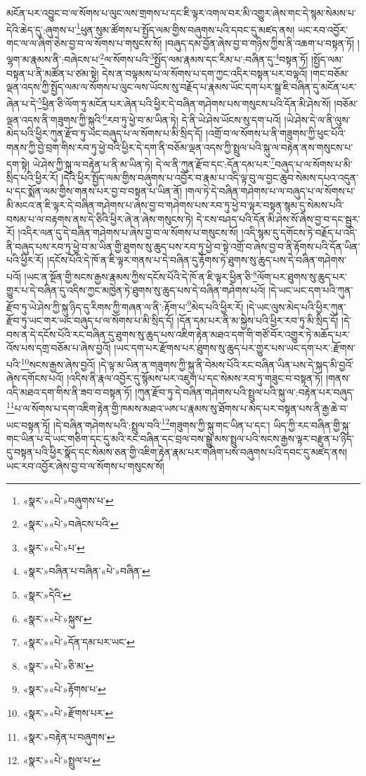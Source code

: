 མངོན་པར་འབྱུང་བ་ལ་སོགས་པ་ལུང་ལས་གྲགས་པ་དང་ཇི་ལྟར་འགལ་བར་མི་འགྱུར་ཞེས་གང་དེ་སྙམ་སེམས་པ་དེའི་ཆེད་དུ་:ཞུགས་པ་\footnote{«སྣར་»«པེ་»བཞུགས་པ་}ཕུན་སུམ་ཚོགས་པ་སྤྱོད་ལམ་གྱིས་བཞུགས་པའི་དབང་དུ་མཛད་ནས། ཡང་རབ་འབྱོར་གང་ལ་ལ་ཞིག་ཅེས་བྱ་བ་ལ་སོགས་པ་གསུངས་སོ། །བཞུད་དམ་བྱོན་ཞེས་བྱ་བ་གཉིས་ཀྱིས་ནི་འཆག་པ་བསྟན་ཏོ། །ལྷག་མ་རྣམས་ནི་:བཞེངས་པ་\footnote{«སྣར་»«པེ་»བཞེངས་པའི་}ལ་སོགས་པའི་\footnote{«སྣར་»«པེ་»པ་}སྤྱོད་ལམ་རྣམས་དང་རིམ་པ་:བཞིན་དུ་\footnote{«སྣར་»བཞིན་པ་བཞིན་«པེ་»བཞིན་}བསྟན་ཏོ། །སྤྱོད་ལམ་བསྟན་པ་ནི་མཚོན་པ་ཙམ་སྟེ། དེས་ན་བལྟམས་པ་ལ་སོགས་པ་དག་ཀྱང་འདིར་བསྟན་པར་བལྟའོ། །གང་བཅོམ་ལྡན་འདས་ཀྱི་སྤྱོད་ལམ་ལ་སོགས་པ་ལུང་ལས་ཡོངས་སུ་བརྗོད་པ་རྣམས་ཡོང་དག་པར་སྒྲ་ཇི་བཞིན་དུ་མངོན་པར་ཞེན་པ་དེ་\footnote{«སྣར་»དེའི་}ཕྱིན་ཅི་ལོག་ཏུ་མངོན་པར་ཞེན་པའི་ཕྱིར་དེ་བཞིན་གཤེགས་པས་གསུངས་པའི་དོན་མི་ཤེས་སོ། །བཅོམ་ལྡན་འདས་ནི་གཟུགས་ཀྱི་སྐུའི་\footnote{«སྣར་»«པེ་»སྐུས་}རབ་ཏུ་ཕྱེ་བ་མ་ཡིན་ཏེ། དེ་ནི་ཡེ་ཤེས་ཡོངས་སུ་དག་པའོ། །ཡེ་ཤེས་དེ་ལ་ནི་ལུས་མེད་པའི་ཕྱིར་ཀུན་རྫོབ་ཏུ་ཡང་བཞུད་པ་ལ་སོགས་པ་མི་སྲིད་དོ། །འགྲོ་བ་ལ་སོགས་པ་ནི་གཟུགས་ཀྱི་ཕུང་པོའི་གནས་ཀྱི་བྱེ་བྲག་གིས་རབ་ཏུ་ཕྱེ་བའི་ཕྱིར་དེ་དག་ནི་བཅོམ་ལྡན་འདས་ཀྱི་སྤྲུལ་པའི་སྐུ་ལ་བརྟེན་ནས་གསུངས་པ་དག་སྟེ། ཡེ་ཤེས་ཀྱི་སྐུ་ལ་བརྟེན་པ་ནི་མ་ཡིན་ཏེ། དེ་ལ་ནི་ཀུན་རྫོབ་དང་:དོན་དམ་པར་\footnote{«སྣར་»«པེ་»དོན་དམ་པར་ཡང་}བཞུད་པ་ལ་སོགས་པ་མི་སྲིད་པའི་ཕྱིར་རོ། །དེའི་ཕྱིར་སྤྱོད་ལམ་གྱིས་བཞུགས་པ་འབྱོར་བ་རྣམ་པ་འདི་ལྟ་བུ་ལ་བྱང་ཆུབ་སེམས་དཔའ་འདུན་པ་དང་སྨོན་ལམ་གྱིས་གནས་པར་བྱ་བ་བསྟན་པ་ཡིན་ནོ། །གལ་ཏེ་དེ་བཞིན་གཤེགས་པ་ལ་བཞུད་པ་ལ་སོགས་པ་མི་མངའ་ན་ཇི་ལྟར་དེ་བཞིན་གཤེགས་པ་ཞེས་བྱ་བ་གཤེགས་པས་རབ་ཏུ་ཕྱེ་བ་ལྟར་བསྟན་སྙམ་དུ་སེམས་པའི་བསམ་པ་ལ་བརྟགས་ནས་དེ་ཅིའི་ཕྱིར་ཞེ་ན་ཞེས་གསུངས་ཏེ། དེ་ངས་བཤད་པའི་དོན་མི་ཤེས་སོ་ཞེས་བྱ་བ་དང་སྦྱར་རོ། །འདིར་ལན་དུ་དེ་བཞིན་གཤེགས་པ་ཞེས་བྱ་བ་ལ་སོགས་པ་གསུངས་སོ། །འདི་སྙམ་དུ་དགོངས་ཏེ་བརྗོད་པ་འདི་ནི་བཞུད་པས་རབ་ཏུ་ཕྱེ་བ་མ་ཡིན་གྱི་ཐུགས་སུ་ཆུད་པས་རབ་ཏུ་ཕྱེ་བ་སྟེ་འགྲོ་བ་ཞེས་བྱ་བ་ནི་རྟོགས་པའི་དོན་ཡིན་པའི་ཕྱིར་རོ། །དངོས་པོའི་དེ་ཁོ་ན་ཇི་ལྟར་གནས་པ་དེ་བཞིན་དུ་རྟོགས་ཏེ་ཐུགས་སུ་ཆུད་པས་དེ་བཞིན་གཤེགས་པའོ། །ཡང་ན་སྔོན་གྱི་སངས་རྒྱས་རྣམས་ཀྱིས་དངོས་པོའི་དེ་ཁོ་ན་ཇི་ལྟར་ཕྱིན་ཅི་\footnote{«སྣར་»«པེ་»ཅི་མ་}ལོག་པར་ཐུགས་སུ་ཆུད་པར་གྱུར་པ་དེ་བཞིན་དུ་འདིས་ཀྱང་མཁྱེན་ཏེ་ཐུགས་སུ་ཆུད་པས་དེ་བཞིན་གཤེགས་པའོ། །དེ་ཡང་ཡང་དག་པའི་ཀུན་རྫོབ་ཏུ་ཡེ་ཤེས་ཀྱི་སྐུ་ཉིད་དུ་རིགས་ཀྱི་གཞན་ལ་ནི་:རྟོག་པ་\footnote{«སྣར་»«པེ་»རྟོགས་པ་}མེད་པའི་ཕྱིར་རོ། །དེ་ཡང་ལུས་མེད་པའི་ཕྱིར་ཀུན་རྫོབ་ཏུ་ཡང་གར་ཡང་བཞུད་པ་ལ་སོགས་པ་མི་སྲིད་དོ། །དོན་དམ་པར་ནི་མ་སྐྱེས་པའི་ཕྱིར་རབ་ཏུ་མི་སྲིད་དོ། །དེ་བས་ན་དེ་དངོས་པོའི་རང་བཞིན་དུ་ཐུགས་སུ་ཆུད་པས་འཇིག་རྟེན་མཐའ་དག་གི་གཙོ་བོར་འགྱུར་ཏེ་མཆོད་པར་འོས་པས་དགྲ་བཅོམ་པ་ཞེས་བྱའོ། །ཡང་དག་པར་རྫོགས་པར་ཐུགས་སུ་ཆུད་པར་གྱུར་པས་ཡང་དག་པར་:རྫོགས་པའི་\footnote{«སྣར་»«པེ་»རྫོགས་པར་}སངས་རྒྱས་ཞེས་བྱའོ། །དེ་ལྟ་མ་ཡིན་ན་གཟུགས་ཀྱི་སྐུ་ནི་བེམས་པོའི་རང་བཞིན་ཡིན་པས་དེ་སྐད་མི་བྱའོ་ཞེས་དགོངས་པའོ། །འདིས་ནི་རྣལ་འབྱོར་དུ་སྙོམས་པར་འཇུག་པ་དང་སེམས་རབ་ཏུ་གཟུང་བ་བསྟན་ཏོ། །གནས་འདི་མཐའ་དག་གིས་ནི་ཟབ་བ་བསྟན་ཏོ། །ཀུན་རྫོབ་ཏུ་དེ་བཞིན་གཤེགས་པའི་སྤྲུལ་པའི་སྐུ་ལ་:བརྟེན་པར་བཞུད་\footnote{«སྣར་»བརྟེན་པ་བཞུགས་}པ་ལ་སོགས་པ་དག་འཇིག་རྟེན་གྱི་ཁམས་མཐའ་ཡས་པ་རྣམས་སུ་ཐོགས་པ་མེད་པར་བསྟན་པས་ནི་རྒྱ་ཆེ་བ་ཡང་བསྟན་ཏོ། །དེ་བཞིན་གཤེགས་པའི་:སྤྲུལ་བའི་\footnote{«སྣར་»«པེ་»སྤྲུལ་པ་}གཟུགས་ཀྱི་སྐུ་གང་ཡིན་པ་དང་། ཡིད་ཀྱི་རང་བཞིན་གྱི་སྐུ་གང་ཡིན་པ་དེ་ཡང་གཅིག་དང་དུ་མའི་རང་བཞིན་དང་བྲལ་བས་སྒྱུ་མས་སྤྲུལ་པའི་སངས་རྒྱས་ལྟར་བརྫུན་པ་ཉིད་དུ་བསྟན་པའི་ཕྱིར་སྣོད་དང་སེམས་ཅན་གྱི་འཇིག་རྟེན་རྣམ་པར་གཞིག་པས་བཞུགས་པའི་དབང་དུ་མཛད་ནས། ཡང་རབ་འབྱོར་ཞེས་བྱ་བ་ལ་སོགས་པ་གསུངས་སོ། 